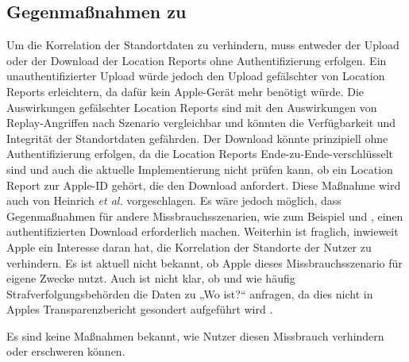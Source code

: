 \subsection{Gegenmaßnahmen zu }
Um die Korrelation der Standortdaten zu verhindern, muss entweder der Upload oder der Download der Location Reports ohne Authentifizierung erfolgen.
Ein unauthentifizierter Upload würde jedoch den Upload gefälschter von Location Reports erleichtern, da dafür kein Apple-Gerät mehr benötigt würde.
Die Auswirkungen gefälschter Location Reports sind mit den Auswirkungen von Replay-Angriffen nach Szenario  vergleichbar und könnten die Verfügbarkeit und Integrität der Standortdaten gefährden.
Der Download könnte prinzipiell ohne Authentifizierung erfolgen, da die Location Reports Ende-zu-Ende-verschlüsselt sind und auch die aktuelle Implementierung nicht prüfen kann, ob ein Location Report zur Apple-ID gehört, die den Download anfordert.
Diese Maßnahme wird auch von Heinrich \textit{et al.} \cite{Heinrich_FindMy} vorgeschlagen.
Es wäre jedoch möglich, dass Gegenmaßnahmen für andere Missbrauchsszenarien, wie zum Beispiel  und , einen authentifizierten Download erforderlich machen.
Weiterhin ist fraglich, inwieweit Apple ein Interesse daran hat, die Korrelation der Standorte der Nutzer zu verhindern.
Es ist aktuell nicht bekannt, ob Apple dieses Missbrauchsszenario für eigene Zwecke nutzt.
Auch ist nicht klar, ob und wie häufig Strafverfolgungsbehörden die Daten zu „Wo ist?“ anfragen, da dies nicht in Apples Transparenzbericht gesondert aufgeführt wird \cite{Apple_Transparency}.

Es sind keine Maßnahmen bekannt, wie Nutzer diesen Missbrauch verhindern oder erschweren können.
